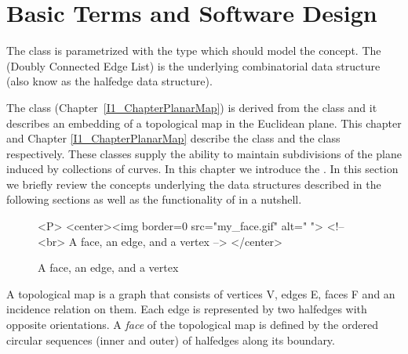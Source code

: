 \section{Basic Terms and Software Design}
   The class is parametrized with the  type which should
   model the  concept. The  (Doubly
   Connected Edge List) is the underlying combinatorial data structure
   (also know as the halfedge data structure).

   The  class
   (Chapter~\ref{I1_ChapterPlanarMap}) is derived from the
    class and it describes an embedding of
   a topological map in the Euclidean plane.  This chapter and Chapter
   \ref{I1_ChapterPlanarMap} describe the  class
   and the  class respectively. These classes supply
   the ability to maintain subdivisions of the plane induced by
   collections of curves. In this chapter we introduce the
   . In this section we briefly review the
   concepts underlying the data structures described in the following
   sections as well as the functionality of  in a
   nutshell.

\begin{figure}
\begin{ccTexOnly}
    \centerline{
    }
\end{ccTexOnly}
\caption{A face, an edge, and a vertex \label{fig:face}}

\begin{ccHtmlOnly}
  <P>
  <center><img border=0 src="my_face.gif" alt=" ">
  <!-- <br> A face, an edge, and a vertex -->
  </center>
\end{ccHtmlOnly}

\end{figure}

A topological map is a graph that consists of vertices V,
edges E, faces F and an incidence relation on them. %
Each edge is represented by two halfedges with opposite orientations.
A {\em face} of the topological map is defined by the ordered
circular sequences 
(inner and outer) of halfedges along its boundary. 

